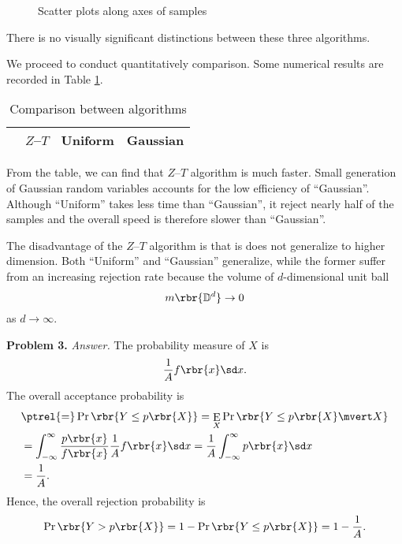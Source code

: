 \documentclass[english, nochinese]{pnote}
\DeclareMathOperator\oppr{\mathrm{Pr}}
\DeclareMathOperator\ope{\mathrm{E}}
\begin{document}
\begin{figure}[htb]
\centering
\scalebox{0.7}{}
\scalebox{0.7}{}
\caption{Scatter plots along axes of samples}
\label{Fig:2D}
\end{figure}

There is no visually significant distinctions between these three algorithms.

We proceed to conduct quantitatively comparison. Some numerical results are recorded in Table \ref{Tbl:Res}.

\begin{table}[htb]
\centering
\begin{tabular}{|c|c|c|c|}
\hline
& $Z$--$T$ & Uniform & Gaussian \\
\hline

\end{tabular}
\caption{Comparison between algorithms}
\label{Tbl:Res}
\end{table}

From the table, we can find that $Z$--$T$ algorithm is much faster. Small generation of Gaussian random variables accounts for the low efficiency of ``Gaussian''. Although ``Uniform'' takes less time than ``Gaussian'', it reject nearly half of the samples and the overall speed is therefore slower than ``Gaussian''.

The disadvantage of the $Z$--$T$ algorithm is that is does not generalize to higher dimension. Both ``Uniform'' and ``Gaussian'' generalize, while the former suffer from an increasing rejection rate because the volume of $d$-dimensional unit ball
\begin{equation}
m \rbr{\mathbb{D}^d} \rightarrow 0 
\end{equation}
as $ d \rightarrow \infty $.

\textbf{Problem 3.} \textit{Answer.} The probability measure of $X$ is
\begin{equation}
\frac{1}{A} f \rbr{x} \sd x.
\end{equation}
The overall acceptance probability is
\begin{equation}
\begin{split}
&\ptrel{=} \oppr \rbr{ Y \le p \rbr{X} } = \ope_X \oppr \rbr{ Y \le p \rbr{X} \mvert X } \\
&= \int_{-\infty}^{\infty} \frac{ p \rbr{x} }{ f \rbr{x} } \frac{1}{A} f \rbr{x} \sd x = \frac{1}{A} \int_{-\infty}^{\infty} p \rbr{x} \sd x \\
&= \frac{1}{A}.
\end{split}
\end{equation}
Hence, the overall rejection probability is
\begin{equation}
\oppr \rbr{ Y > p \rbr{X} } = 1 - \oppr \rbr{ Y \le p \rbr{X} } = 1 - \frac{1}{A}.
\end{equation}
\end{document}
